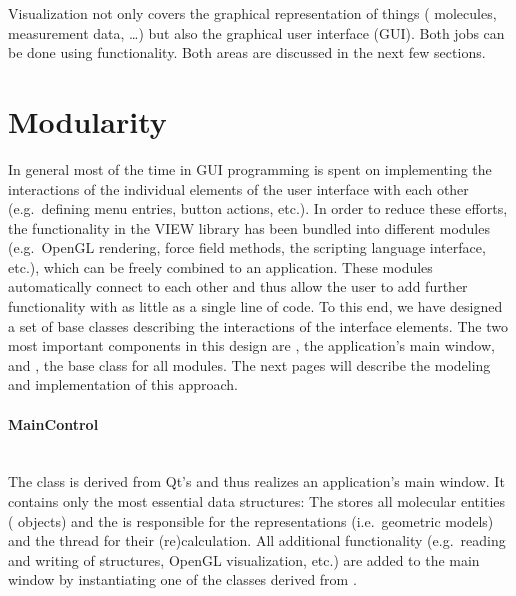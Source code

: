 Visualization not only covers the graphical representation of things (\eg
molecules, measurement data, \dots) but also the graphical user interface
(GUI). Both jobs can be done using  functionality. Both areas are
discussed in the next few sections.

\section{Modularity}
In general most of the time in GUI programming
is spent on implementing the interactions of the individual elements of the user interface
with each other (e.g.\ defining menu entries, button actions, etc.). 
In order to reduce these efforts, the functionality in the VIEW library has been bundled 
into different modules (e.g.\ OpenGL rendering, force field 
methods, the scripting language interface, etc.), which can be freely combined to 
an application. These modules automatically connect to each other and thus allow the user
to add further functionality with as little as a single line of code.
To this end, we have designed a set of  base classes describing the interactions of the 
interface elements. The two most important components in this 
design are , the application's main window, and 
, the base class for all modules.
The next pages will describe the modeling and implementation of this approach.
\label{modularity}

\paragraph{MainControl} 
\hspace*{\fill}\\
The class  is derived from Qt's  and thus realizes an 
application's main window. It contains only the most essential data structures:
The  stores all molecular entities ( objects) and
the  is responsible for the representations 
(i.e.\ geometric models) and the thread for their (re)calculation. 
All additional functionality (e.g.\ reading and writing of structures, OpenGL visualization,
etc.) are added to the main window by instantiating one of the classes derived from 
. 

